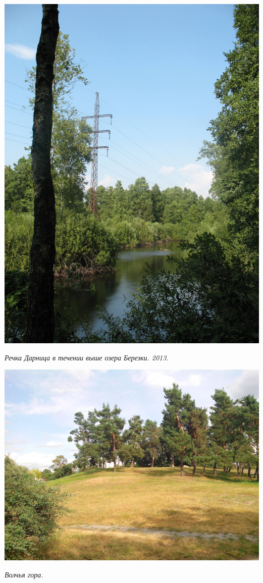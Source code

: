 \begin{center}
\includegraphics[width=\linewidth]{lpix/darn-reka.jpg}

\textit{Речка Дарница в течении выше озера Березки. 2013.}
\end{center}

\vspace*{\fill}

\newpage

\begin{center}
\includegraphics[width=0.95\linewidth]{lpix/IMG_20140817_161555.jpg}

\textit{Волчья гора.}
\end{center}

